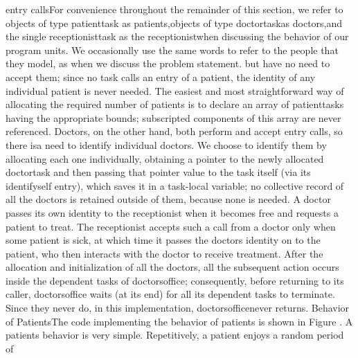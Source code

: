 entry calls\NtFoot[]\NtNtpar[]For convenience throughout the remainder
of this section, we refer to objects of type \tyxffmxmono[]patient\Symuns[]task%
\tyxffmxendmono[] as \ldquo[]patients,\rdquo[] objects of type %
\tyxffmxmono[]doctor\Symuns[]task\tyxffmxendmono[] as \ldquo[]doctors,\rdquo[]
and the single \tyxffmxmono[]receptionist\tyxffmxendmono[] task as
\ldquo[]the receptionist\rdquo[] when discussing the behavior of our
program units. We occasionally use the same words to refer to the
people that they model, as when we discuss the problem statement.%
\NtEndntpar[]\NtEndfoot[] but have no need to accept them; since no
task calls an entry of a patient, the identity of any individual patient
is never needed. The easiest and most straightforward way of allocating
the required number of patients is to declare an array of %
\tyxffmxmono[]patient\Symuns[]task\tyxffmxendmono[]s having the appropriate
bounds; subscripted components of this array are never referenced.
Doctors, on the other hand, both perform and accept entry calls, so
there \txtxemph[]is\txtxendemph[] a need to identify individual doctors.
We choose to identify them by allocating each one individually, obtaining
a pointer to the newly allocated \tyxffmxmono[]doctor\Symuns[]task%
\tyxffmxendmono[] and then passing that pointer value to the task
itself (via its \tyxffmxmono[]identify\Symuns[]self%
\tyxffmxendmono[] entry), which saves it in a task-local variable;
no collective record of all the doctors is retained outside of them,
because none is needed. A doctor passes its own identity to the receptionist
when it becomes free and requests a patient to treat. The receptionist
accepts such a call from a doctor only when some patient is sick,
at which time it passes the doctor\rsquo[]s identity on to the patient,
who then interacts with the doctor to receive treatment.%
\Endpara[]
\Para[]After the allocation and initialization of all the doctors,
all the subsequent action occurs inside the dependent tasks of %
\tyxffmxmono[]doctors\Symuns[]office\tyxffmxendmono[]; consequently,
before returning to its caller, \tyxffmxmono[]doctors\Symuns[]office%
\tyxffmxendmono[] waits (at its end) for all its dependent tasks to
terminate. Since they never do, in this implementation, %
\tyxffmxmono[]doctors\Symuns[]office\tyxffmxendmono[] never returns.%
\Endpara[]
\DivEndiv[]
\DivLiv[]\HdMinLiv[]Behavior of Patients\HdMinEndiv[]
\Para[]The code implementing the behavior of patients is shown in
Figure . A patient\rsquo[]s behavior
is very simple. Repetitively, a patient enjoys a random period of
